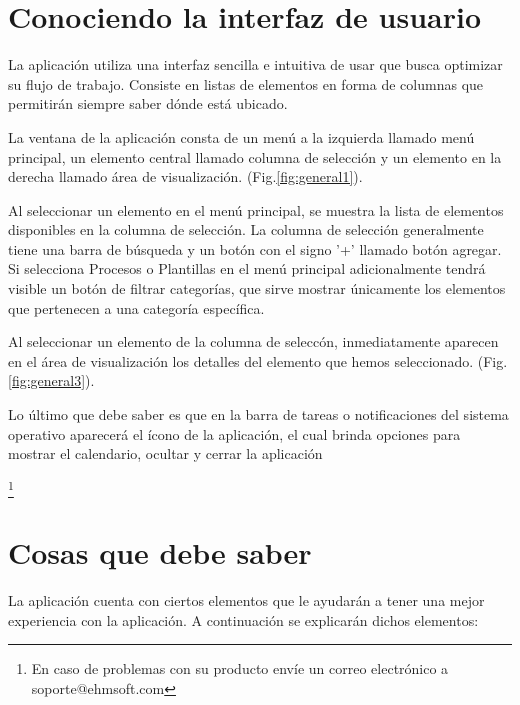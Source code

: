 \section{Conociendo la interfaz de usuario}
La aplicaci\'on utiliza una interfaz sencilla e intuitiva de usar que busca optimizar su flujo de trabajo. Consiste en listas de elementos en forma de columnas que permitir\'an siempre saber d\'onde est\'a ubicado.

La ventana de la aplicaci\'on consta de un men\'u a la izquierda llamado men\'u principal, un elemento central llamado columna de selecci\'on y un elemento en la derecha llamado \'area de visualizaci\'on. (Fig.\ref{fig:general1}). 


Al seleccionar un elemento en el men\'u principal, se muestra la lista de elementos disponibles en la columna de selecci\'on. La columna de selecci\'on generalmente tiene una barra de b\'usqueda y un bot\'on con el signo '+' llamado bot\'on agregar. Si selecciona Procesos o Plantillas en el men\'u principal adicionalmente tendr\'a visible un bot\'on de filtrar categor\'ias, que sirve mostrar \'unicamente los elementos que pertenecen a una categor\'ia espec\'ifica.

Al seleccionar un elemento de la columna de selecc\'on, inmediatamente aparecen en el \'area de visualizaci\'on los detalles del elemento que hemos seleccionado. (Fig.\ref{fig:general3}). 

Lo \'ultimo que debe saber es que en la barra de tareas o notificaciones del sistema operativo aparecer\'a el \'icono de la aplicaci\'on, el cual brinda opciones para mostrar el calendario, ocultar y cerrar la aplicaci\'on

\footnote{En caso de problemas con su producto env\'ie un correo
electr\'onico a \mbox{soporte@ehmsoft.com}}

\section{Cosas que debe saber}
La aplicaci\'on cuenta con ciertos elementos que le ayudar\'an a tener una
mejor experiencia con la aplicaci\'on. A continuaci\'on se explicar\'an dichos elementos:

